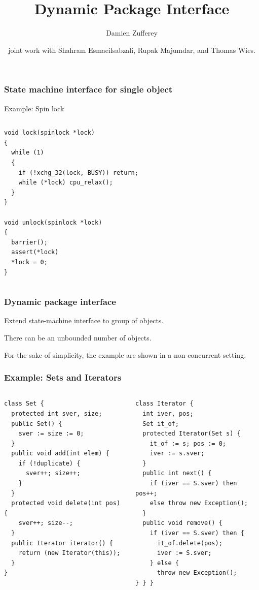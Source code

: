 \documentclass{beamer}
\title[DPI]{Dynamic Package Interface}
\author{Damien Zufferey}
\institute{
  IST Austria
}
\date{joint work with Shahram Esmaeilsabzali, Rupak Majumdar, and Thomas Wies.}
\begin{document}
\frame[plain]{\titlepage}

\begin{frame}[fragile]
  \frametitle{State machine interface for single object}
  Example: Spin lock 
  \begin{columns}
{\scriptsize
\begin{verbatim}
void lock(spinlock *lock)
{
  while (1)
  {
    if (!xchg_32(lock, BUSY)) return;
    while (*lock) cpu_relax();
  }
}

void unlock(spinlock *lock)
{
  barrier();
  assert(*lock)
  *lock = 0;
}
\end{verbatim}
}
  \end{columns}
\end{frame}

\begin{frame}
  \frametitle{Dynamic package interface}

  Extend state-machine interface to group of objects.

  \vspace{3ex}
  There can be an unbounded number of objects.

  For the sake of simplicity, the example are shown in a non-concurrent setting.

\end{frame}

\begin{frame}[fragile]
  \frametitle{Example: Sets and Iterators}
  \begin{columns}
{\footnotesize
\begin{verbatim}
class Set {
  protected int sver, size;
  public Set() {
    sver := size := 0;
  }
  public void add(int elem) {
    if (!duplicate) {
      sver++; size++;
    }
  }
  protected void delete(int pos) {
    sver++; size--;
  }
  public Iterator iterator() {
    return (new Iterator(this));
  }
}
\end{verbatim}
}
{\footnotesize
\begin{verbatim}
class Iterator {
  int iver, pos;
  Set it_of;
  protected Iterator(Set s) {
    it_of := s; pos := 0;
    iver := s.sver;
  }
  public int next() {
    if (iver == S.sver) then pos++;
    else throw new Exception();
  }
  public void remove() {
    if (iver == S.sver) then {
      it_of.delete(pos);
      iver := S.sver;
    } else {
      throw new Exception();
} } }
\end{verbatim}
}
  \end{columns}

\end{frame}
\end{document}
